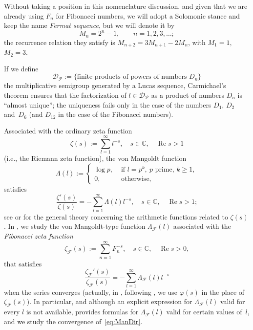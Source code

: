 \documentclass[11pt, a4paper]{article}
\newcommand{\C}{\mathbb{C}}
\renewcommand{\Re}{\operatorname{Re}}
\newcommand{\calF}{\mathcal{F}}
\newcommand{\manF}{\Lambda_{\mathcal{F}}}
\theoremstyle{plain}
\theoremstyle{definition}
\begin{document}
Without taking a position in this nomenclature discussion, and given that we are already using $F_n$ for Fibonacci numbers, we will adopt a Solomonic stance and keep the name \textit{Fermat sequence}, but we will denote it by 
\begin{equation*}
  M_n = 2^n - 1, \qquad n=1,2,3,\dots;
\end{equation*}
the recurrence relation they satisfy is $M_{n+2}=3M_{n+1}-2M_{n}$, with $M_1=1$, $M_2=3$.

If we define 
\[
  \mathcal{D}_\mathcal{P} := \{\text{finite products of powers of numbers $D_n$}\}
\]
the multiplicative semigroup generated by a Lucas sequence,
Carmichael's theorem ensures that the factorization of $l \in \mathcal{D}_\mathcal{P}$
as a product of numbers $D_n$ is ``almost unique''; the uniqueness fails only in the case of the numbers $D_1$, $D_2$ and~$D_6$ (and $D_{12}$ in the case of the Fibonacci numbers).

Associated with the ordinary zeta function 
\begin{equation*}
  \zeta(s) := \sum_{l=1}^{\infty} l^{-s},
  \quad s\in \C, \quad \Re s>1
\end{equation*}
(i.e., the Riemann zeta function), the von Mangoldt function 
\[
  \Lambda(l) := 
  \begin{cases}
    \log p, & \text{ if } l = p^{k}, \ p\text{ prime, }k\geq 1, 
    \\ 
    0, & \text{ otherwise,}
  \end{cases}
\]
satisfies
\begin{equation*}
  \frac{\zeta'(s)}{\zeta(s)} = -\sum_{l=1}^{\infty} \Lambda(l)l^{-s},
  \quad s \in \C, \quad \Re s>1;
\end{equation*}
see \cite{Ap} or \cite{HaWr} for the general theory concerning the arithmetic functions related to $\zeta(s)$.
In \cite{MoNaVa}, we study the von Mangoldt-type function $\manF(l)$ associated with the \textit{Fibonacci zeta function}
\begin{equation*}
  \zeta_{\calF}(s) := \sum_{n=1}^{\infty} F_{n}^{-s},
  \quad s\in \C, \quad \Re s>0,
\end{equation*}
that satisfies
\begin{equation}
\label{eq:ManDir}
  \frac{\zeta_{\calF}'(s)}{\zeta_{\calF}(s)} = -\sum_{l=1}^{\infty} \manF(l)l^{-s}
\end{equation} 
when the series converges
(actually, in \cite{MoNaVa}, following \cite{Na, Mo}, we use $\varphi(s)$ in the place of $\zeta_{\calF}(s)$). In particular, and although an explicit expression for $\manF(l)$ valid for every $l$ is not available, \cite{MoNaVa} provides formulas for $\manF(l)$ valid for certain values of~$l$, and we study the convergence of~\eqref{eq:ManDir}.
\end{document}
